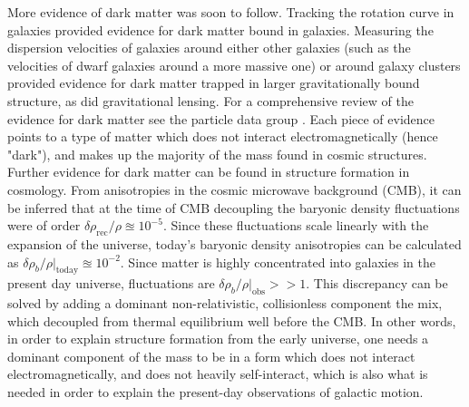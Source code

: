 More evidence of dark matter was soon to follow. Tracking the rotation curve in galaxies provided evidence for dark matter bound in galaxies\cite{}. Measuring the dispersion velocities of galaxies around either other galaxies (such as the velocities of dwarf galaxies around a more massive one) or around galaxy clusters provided evidence for dark matter trapped in larger gravitationally bound structure, as did gravitational lensing\cite{}. For a comprehensive review of the evidence for dark matter see the particle data group \cite{PDG2022}. Each piece of evidence points to a type of matter which does not interact electromagnetically (hence "dark"), and makes up the majority of the mass found in cosmic structures. \\

Further evidence for dark matter can be found in structure formation in cosmology. From anisotropies in the cosmic microwave background (CMB), it can be inferred that at the time of CMB decoupling the baryonic density fluctuations were of order $\delta\rho_\mathrm{rec} / \rho \approxeq 10^{-5}$. Since these fluctuations scale linearly with the expansion of the universe, today's baryonic density anisotropies can be calculated as $\delta\rho_b / \rho |_\mathrm{today}\approxeq 10^{-2}$\cite{PDG2022}. Since matter is highly concentrated into galaxies in the present day universe, fluctuations are $\delta\rho_b / \rho |_\mathrm{obs}>> 1$. This discrepancy can be solved by adding a dominant non-relativistic, collisionless component the mix, which decoupled from thermal equilibrium well before the CMB. In other words, in order to explain structure formation from the early universe, one needs a dominant component of the mass to be in a form which does not interact electromagnetically, and does not heavily self-interact, which is also what is needed in order to explain the present-day observations of galactic motion. \\

